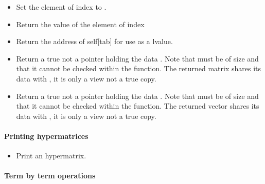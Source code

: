 \begin{itemize}
\item   {}
  \sshortdescribe Set the element of index  to .
  
\item {}
  \sshortdescribe Return the value of the element of index  
  
\item {}
  \sshortdescribe Return the address of self[tab] for use as a lvalue.  

\item {}
  \sshortdescribe Return a true  not a pointer holding the data
  . Note that  must be of size  and that it
  cannot be checked within the function. The returned matrix shares its data
  with , it is only a view not a true copy.

\item {}
  \sshortdescribe Return a true  not a pointer holding the data
  . Note that  must be of size  and that it
  cannot be checked within the function. The returned vector shares its data
  with , it is only a view not a true copy.


\end{itemize}  

\paragraph{Printing hypermatrices}

\begin{itemize}
\item {}
  \sshortdescribe Print an hypermatrix.
\end{itemize}

\paragraph{Term by term operations}

